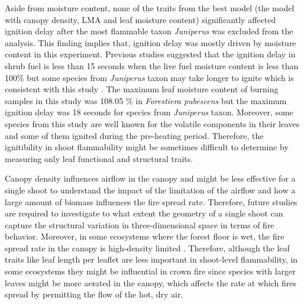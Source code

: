 \documentclass{ttuthes2007}
\begin{document}
Aside from moisture content, %
none of the traits from the best model (the model with canopy density, LMA and leaf moisture content) significantly affected ignition delay after the most flammable taxon \emph{Juniperus} was excluded from the analysis. %
This finding implies that, ignition delay was mostly driven by moisture content in this experiment. Previous studies suggested that the ignition delay in shrub fuel is less than 15 seconds when the live fuel moisture content %
is less than 100\% but some species from \emph{Juniperus} taxon may take longer to ignite which is consistent with this study \citep{dimitrakopoulos2001flammability,pellizzaro2007seasonal}. The maximum leaf moisture content of burning samples
in this study was 108.05 \% in \emph{Forestiera pubescens} but the maximum ignition delay was 18 seconds for species from \emph{Juniperus} taxon.
Moreover, some species from this study are well known for the volatile components in their leaves and some of them  ignited during the pre-heating period. Therefore, the ignitibility in shoot flammability might be sometimes difficult to determine by measuring only leaf functional and structural traits.

Canopy density influences airflow in the canopy \citep{cionco1978analysis} and might be less effective for a single shoot to understand the impact of the limitation of the airflow and how a large amount of biomass influences the fire spread rate. %
Therefore, future studies are required to investigate to what extent the geometry of a single shoot can capture the structural variation in three-dimensional space in terms of fire behavior. Moreover, in some ecosystems where the forest floor is wet, the fire spread rate in the canopy is high-density limited  \citep{ray2005micrometeorological}. Therefore, although the leaf traits like leaf length per leaflet are less important in shoot-level flammability, in some ecosystems they might be influential in crown fire since species with larger leaves might be more aerated in the canopy, which affects the rate at which fires spread by permitting the flow of the hot, dry air. 
\end{document}
